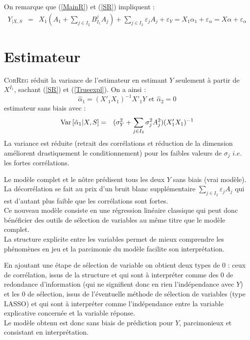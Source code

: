 \documentclass[12pt]{article}
\begin{document}
On remarque que (\ref{MainR}) et (\ref{SR}) impliquent :
\begin{eqnarray}
	Y_{|X,S}&=&X_1 (A_{1}+ \sum_{j \in I_2}B^{j}_{I_1}A_{j})+  \sum_{j \in I_2}\varepsilon_{j}A_{j}+\varepsilon_Y 
					= X_1\alpha_{1}+ \varepsilon_{\alpha}=X\alpha+ \varepsilon_{\alpha} \label{Trueexpl} 			
\end{eqnarray}
\section{Estimateur}
		\textsc{CorReg} réduit la variance de l'estimateur en estimant $Y$ seulement à partir de $X^{I_1}$, sachant (\ref{SR}) et (\ref{Trueexpl}).
			On a ainsi : 
		\begin{equation}
			\hat{\alpha}_{1} = (X'_{1} X_1)^{-1}X'_{1}Y \textrm{ et } \hat{\alpha}_{2} = 0
		\end{equation}
		estimateur sans biais \cite{saporta2006probabilites} avec :
		\begin{eqnarray}
			{\rm Var}\,[\hat{\alpha}_{1}|X,S]&=& (\sigma^2_Y+\sum_{j \in I_2}\sigma^2_{j}A_{j}^2 )(X'_{1} X_{1})^{-1}
		\end{eqnarray}
		La variance est réduite (retrait des corrélations et réduction de la dimension améliorent drastiquement le conditionnement) pour les faibles valeurs de $\sigma_j$ $i.e.$ les fortes corrélations.					
		
		Le modèle complet et le nôtre prédisent tous les deux $Y$ sans biais (vrai modèle). La décorrélation se fait au prix d'un bruit blanc supplémentaire $\sum_{j \in I_2}\varepsilon_{j}A_{j} $ qui est d'autant plus faible que les corrélations sont fortes.
	\\	
	Ce nouveau modèle consiste en une régression linéaire classique qui peut donc bénéficier des outils de sélection de variables au même titre que le modèle complet.			
		 \\		
		 La structure explicite entre les variables permet de mieux comprendre les phénomènes en jeu et la parcimonie du modèle facilite son interprétation.		

		En ajoutant une étape de sélection de variable on obtient deux types de $0$ : ceux de corrélation, issus de la structure et qui sont à interpréter comme des $0$ de redondance d'information (qui ne signifient donc en rien l'indépendance avec $Y$) et les $0$ de sélection, issus de l'éventuelle méthode de sélection de variables (type LASSO) et qui sont à interpréter comme l'indépendance entre la variable explicative concernée et la variable réponse.
			\\
		Le modèle obtenu est donc sans biais de prédiction pour $Y$, parcimonieux et consistant en interprétation.	
		
\end{document}
